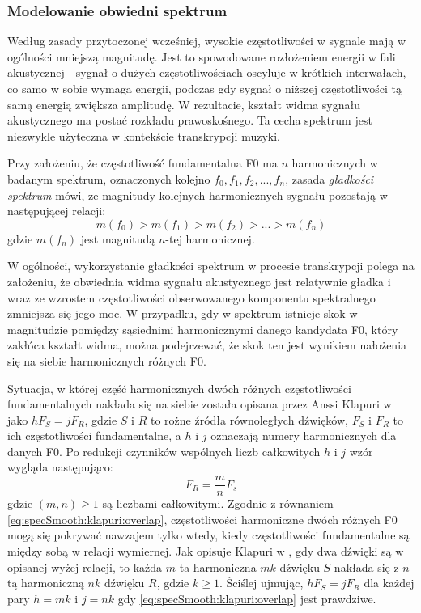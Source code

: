 \documentclass[12pt,a4paper,twoside]{mwart}
\begin{document}
\subsubsection{Modelowanie obwiedni spektrum}\label{sec:specSmoothnes}
Według zasady przytoczonej wcześniej, wysokie częstotliwości w sygnale mają w ogólności mniejszą magnitudę. Jest to spowodowane rozłożeniem energii w fali akustycznej - sygnał o dużych częstotliwościach oscyluje w krótkich interwałach, co samo w sobie wymaga energii, podczas gdy sygnał o niższej częstotliwości tą samą energią zwiększa amplitudę. W rezultacie, kształt widma sygnału akustycznego ma postać rozkładu prawoskośnego. Ta cecha spektrum jest niezwykle użyteczna w kontekście transkrypcji muzyki.

Przy założeniu, że częstotliwość fundamentalna F0 ma $n$ harmonicznych w badanym spektrum, oznaczonych kolejno $f_0, f_1, f_2, ..., f_n$, zasada \textit{gładkości spektrum} mówi, ze magnitudy kolejnych harmonicznych sygnału pozostają w następującej relacji:
\begin{equation}\label{eq:specSmooth:principle}
  m(f_0) > m(f_1) > m(f_2) > ... > m(f_n)
\end{equation}
gdzie $m(f_n)$ jest magnitudą $n$-tej harmonicznej.

W ogólności, wykorzystanie gładkości spektrum w procesie transkrypcji polega na założeniu, że obwiednia widma sygnału akustycznego jest relatywnie gładka i wraz ze wzrostem częstotliwości obserwowanego komponentu spektralnego zmniejsza się jego moc. W przypadku, gdy w spektrum istnieje skok w magnitudzie pomiędzy sąsiednimi harmonicznymi danego kandydata F0, który zakłóca kształt widma, można podejrzewać, że skok ten jest wynikiem nałożenia się na siebie harmonicznych różnych F0.


Sytuacja, w której część harmonicznych dwóch różnych częstotliwości fundamentalnych nakłada się na siebie została opisana przez Anssi Klapuri w 
\cite[3382]{Transcription:Klapuri:MultipitchEstimationAndSeparation} 
jako $hF_S = jF_R$, gdzie $S$ i $R$ to rożne źródła równoległych dźwięków, $F_S$ i $F_R$ to ich częstotliwości fundamentalne, a $h$ i $j$ oznaczają numery harmonicznych dla danych F0. Po redukcji czynników wspólnych liczb całkowitych $h$ i $j$ wzór wygląda następująco:
\begin{equation}\label{eq:specSmooth:klapuri:overlap}
  F_R = \frac{m}{n}F_s
\end{equation}
gdzie $(m, n) \geqslant 1$ są liczbami całkowitymi. Zgodnie z równaniem \ref{eq:specSmooth:klapuri:overlap}, częstotliwości harmoniczne dwóch różnych F0 mogą się pokrywać nawzajem tylko wtedy, kiedy częstotliwości fundamentalne są między sobą w relacji wymiernej. Jak opisuje Klapuri w 
\cite[3382]{Transcription:Klapuri:MultipitchEstimationAndSeparation}
, gdy dwa dźwięki są w opisanej wyżej relacji, to każda $m$-ta harmoniczna $mk$ dźwięku $S$ nakłada się z $n$-tą harmoniczną $nk$ dźwięku $R$, gdzie $k \geqslant 1$. Ściślej ujmując, $hF_S = jF_R$ dla każdej pary $h=mk$ i $j=nk$ gdy \ref{eq:specSmooth:klapuri:overlap} jest prawdziwe.
\end{document}

